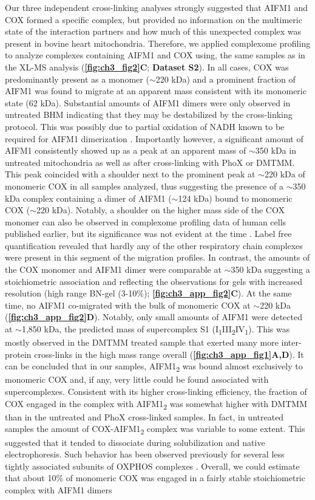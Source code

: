 Our three independent cross-linking analyses strongly suggested that AIFM1 and COX formed a specific complex, but provided no information on the multimeric state of the interaction partners and how much of this unexpected complex was present in bovine heart mitochondria. Therefore, we applied complexome profiling to analyze complexes containing AIFM1 and COX using, the same samples as in the XL-MS analysis (\textbf{\autoref{fig:ch3_fig2}C}; \textbf{Dataset S2}). In all cases, COX was predominantly present as a monomer ($\sim$220 kDa) and a prominent fraction of AIFM1 was found to migrate at an apparent mass consistent with its monomeric state (62 kDa). Substantial amounts of AIFM1 dimers were only observed in untreated BHM indicating that they may be destabilized by the cross-linking protocol. This was possibly due to partial oxidation of NADH known to be required for AIFM1 dimerization \cite{RN8}. Importantly however, a significant amount of AIFM1 consistently showed up as a peak at an apparent mass of $\sim$350 kDa in untreated mitochondria as well as after cross-linking with PhoX or DMTMM. This peak coincided with a shoulder next to the prominent peak at $\sim$220 kDa of monomeric COX in all samples analyzed, thus suggesting the presence of a $\sim$350 kDa complex containing a dimer of AIFM1 ($\sim$124 kDa) bound to monomeric COX ($\sim$220 kDa). Notably, a shoulder on the higher mass side of the COX monomer can also be observed in complexome profiling data of human cells published earlier, but its significance was not evident at the time \cite{RN34}. Label free quantification revealed that hardly any of the other respiratory chain complexes were present in this segment of the migration profiles. In contrast, the amounts of the COX monomer and AIFM1 dimer were comparable at $\sim$350 kDa suggesting a stoichiometric association and reflecting the observations for gels with increased resolution (high range BN-gel (3-10\%); \textbf{\autoref{fig:ch3_app_fig2}C}). At the same time, no AIFM1 co-migrated with the bulk of monomeric COX at $\sim$220 kDa (\textbf{\autoref{fig:ch3_app_fig2}D}). Notably, only small amounts of AIFM1 were detected at $\sim$1,850 kDa, the predicted mass of supercomplex S1 (I\textsubscript{1}III\textsubscript{2}IV\textsubscript{1}). This was mostly observed in the DMTMM treated sample that exerted many more inter-protein cross-links in the high mass range overall (\textbf{\autoref{fig:ch3_app_fig1}A,D}). It can be concluded that in our samples, AIFM1\textsubscript{2} was bound almost exclusively to monomeric COX and, if any, very little could be found associated with supercomplexes. Consistent with its higher cross-linking efficiency, the fraction of COX engaged in the complex with AIFM1\textsubscript{2} was somewhat higher with DMTMM than in the untreated and PhoX cross-linked samples. In fact, in untreated samples the amount of COX-AIFM1\textsubscript{2} complex was variable to some extent. This suggested that it tended to dissociate during solubilization and native electrophoresis. Such behavior has been observed previously for several less tightly associated subunits of OXPHOS complexes \cite{RN36, RN37, RN35}. Overall, we could estimate that about 10\% of monomeric COX was engaged in a fairly stable stoichiometric complex with AIFM1 dimers 